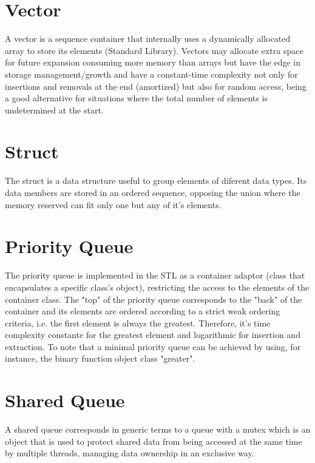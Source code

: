 \section{Vector}
A vector is a sequence container that internally uses a dynamically allocated array to store its elements (Standard Library). Vectors may allocate extra space for future expansion consuming more memory than arrays but have the edge in storage management/growth and have a constant-time complexity not only for insertions and removals at the end (amortized) but also for random access, being a good alternative for situations where the total number of elements is undetermined at the start.

\section{Struct}
The struct is a data structure useful to group elements of diferent data types. Its data members are stored in an ordered sequence, opposing the union where the memory reserved can fit only one but any of it's elements.

\section{Priority Queue}
The priority queue is implemented in the STL as a container adaptor (class that encapsulates a specific class's object), restricting the access to the elements of the container class. The "top" of the priority queue corresponds to the "back" of the container and its elements are ordered according to a strict weak ordering criteria, i.e. the first element is always the greatest. Therefore, it's time complexity constante for the greatest element and logarithmic for insertion and extraction.
To note that a minimal priority queue can be achieved by using, for instance, the binary function object class "greater".

\section{Shared Queue}
A shared queue corresponds in generic terms to a queue with a mutex which is an object that is used to protect shared data from being accessed at the same time by multiple threads, managing data ownership in an exclusive way.

